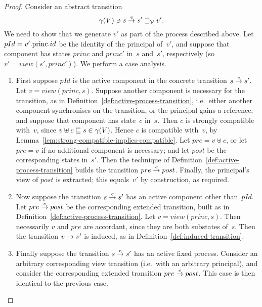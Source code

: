 \begin{proof} 
Consider an abstract transition
\[
\gamma(V) \ni s \stackrel{e}\rightarrow s' \sqsupseteq_{\mathcal{V}} v'.
\]
We need to show that we generate $v'$ as part of the process described above.
Let $pId = v'.\mathrm{princ}.id$ be the identity of the principal of~$v'$, and suppose
that component has states $princ$ and $princ'$ in~$s$ and~$s'$, respectively
(so $v' = view(s', princ')$).  We perform a case analysis.
%
\begin{enumerate}
\item
First suppose $pId$ is the active component in the concrete transition
\( {s \stackrel{e}\rightarrow s'} \).
Let $v = view(princ, s)$.  
%
Suppose another component is necessary for the transition, as in
Definition~\ref{def:active-process-transition}, i.e.~either another component
synchronises on the transition, or the principal gains a reference, and
suppose that component has state~$c$ in~$s$.  Then $c$ is strongly compatible
with~$v$, since $v \uplus c \sqsubseteq s \in \gamma(V)$.  Hence $c$ is compatible
with~$v$, by Lemma~\ref{lem:strong-compatible-implies-compatible}.
%
Let $pre = v \uplus c$, or let $pre = v$ if no additional component is
necessary; and let $post$ be the corresponding states in~$s'$.  Then the
technique of Definition~\ref{def:active-process-transition} builds the
transition \( pre \stackrel{e}\rightarrow post \).  Finally, the principal's view of $post$
is extracted; this equals~$v'$ by construction, as required. 


\item
Now suppose the transition $s \stackrel{e}\rightarrow s'$ has an active component other
than~$pId$.  Let $pre \stackrel{e}\rightarrow post$ be the corresponding extended
transition, built as in Definition~\ref{def:active-process-transition}.  Let
$v = view(princ, s)$.  Then necessarily $v$ and $pre$ are accordant, since
they are both substates of~$s$.  Then the transition $v \stackrel{}\rightarrow v'$ is
induced, as in Definition~\ref{def:induced-transition}.

\item\label{step:abs-trans-correct-3}
Finally suppose the transition $s \stackrel{e}\rightarrow s'$ has an active fixed process.
Consider an arbitrary corresponding view transition (i.e.~with an arbitrary
principal), and consider the corresponding extended transition $pre \stackrel{e}\rightarrow
post$.  This case is then identical to the previous case.
\end{enumerate}
\end{proof}


